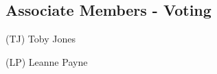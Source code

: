 \documentclass[11pt,hacksoc]{meetingmins}
\begin{document}
\subsection{Associate Members - Voting}
\begin{items}
	\item
	(TJ) Toby Jones
	\item
	(LP) Leanne Payne
\end{items}
\end{document}
